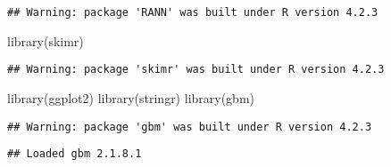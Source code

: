 \documentclass[
]{article}
\newenvironment{Shaded}{\begin{snugshade}}{\end{snugshade}}
\newcommand{\FunctionTok}[1]{\textcolor[rgb]{0.00,0.00,0.00}{#1}}
\newcommand{\NormalTok}[1]{#1}
\begin{document}
\begin{verbatim}
## Warning: package 'RANN' was built under R version 4.2.3
\end{verbatim}

\begin{Shaded}
\begin{Highlighting}[]
\FunctionTok{library}\NormalTok{(skimr)}
\end{Highlighting}
\end{Shaded}

\begin{verbatim}
## Warning: package 'skimr' was built under R version 4.2.3
\end{verbatim}

\begin{Shaded}
\begin{Highlighting}[]
\FunctionTok{library}\NormalTok{(ggplot2)}
\FunctionTok{library}\NormalTok{(stringr)}
\FunctionTok{library}\NormalTok{(gbm)}
\end{Highlighting}
\end{Shaded}

\begin{verbatim}
## Warning: package 'gbm' was built under R version 4.2.3
\end{verbatim}

\begin{verbatim}
## Loaded gbm 2.1.8.1
\end{verbatim}
\end{document}
